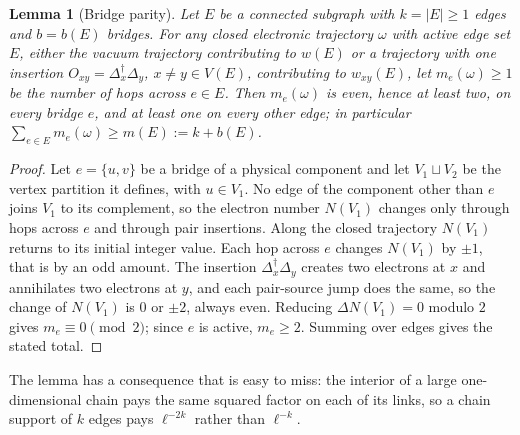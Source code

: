 \documentclass[11pt]{article}
\theoremstyle{plain}
\newtheorem{lemma}{Lemma}
\theoremstyle{definition}
\newcommand{\Dop}{\Delta}
\begin{document}
\begin{lemma}[Bridge parity]\label{lem:bridge}
Let $E$ be a connected subgraph with $k=|E|\ge1$ edges and $b=b(E)$ bridges. For any
closed electronic trajectory $\omega$ with active edge set $E$, either the vacuum
trajectory contributing to $w(E)$ or a trajectory with one insertion
$O_{xy}=\Dop_x^\dagger\Dop_y$, $x\ne y\in V(E)$, contributing to $w_{xy}(E)$, let
$m_e(\omega)\ge1$ be the number of hops across $e\in E$. Then $m_e(\omega)$ is even,
hence at least two, on every bridge $e$, and at least one on every other edge; in
particular $\sum_{e\in E}m_e(\omega)\ge m(E):=k+b(E)$.
\end{lemma}

\begin{proof}
Let $e=\{u,v\}$ be a bridge of a physical component and let $V_1\sqcup V_2$ be the
vertex partition it defines, with $u\in V_1$. No edge of the component other than $e$
joins $V_1$ to its complement, so the electron number $N(V_1)$ changes only through
hops across $e$ and through pair insertions. Along the closed trajectory
$N(V_1)$ returns to its initial integer value. Each hop across $e$ changes $N(V_1)$ by
$\pm1$, that is by an odd amount. The insertion $\Dop_x^\dagger\Dop_y$ creates two
electrons at $x$ and annihilates two electrons at $y$, and each pair-source jump does
the same, so the change of $N(V_1)$ is $0$ or $\pm2$, always even. Reducing
$\Delta N(V_1)=0$ modulo $2$ gives $m_e\equiv0\pmod2$; since $e$ is active,
$m_e\ge2$. Summing over edges gives the stated total.
\end{proof}

The lemma has a consequence that is easy to miss: the interior of a large
one-dimensional chain pays the same squared factor on each of its links, so a chain
support of $k$ edges pays $\ell^{-2k}$ rather than $\ell^{-k}$.
\end{document}
